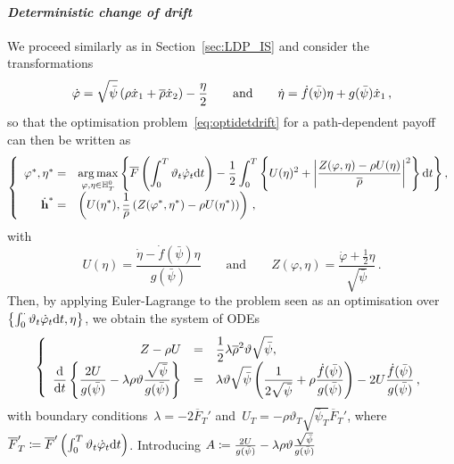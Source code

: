 \paragraph{\textit{Deterministic change of drift}}
We proceed similarly as in Section~\ref{sec:LDP_IS} and consider the  transformations
$$
\dot{\varphi} = \sqrt{\bar\psi}\left( \rho\dot{x}_1 + \overline{\rho}\dot{x}_2 \right) - \frac{\eta}{2} \qquad \text{and} \qquad \dot{\eta} = \dot{f}(\bar\psi)\eta + g(\bar\psi)\dot{x}_1\,,
$$
so that the optimisation problem~\eqref{eq:optidetdrift} for a path-dependent payoff can then be written as
\begin{equation}\label{eq:optidetdriftapplication}
\left\{
\begin{array}{rl}
\varphi^{*}, \eta^{*} = & \displaystyle  \operatorname*{arg\,max}\limits_{\varphi,\eta \in \mathbb{H}_T^0} \left\{ \overline{F}\left(\int_0^T \vartheta_t \dot{\varphi}_t \mathrm{d} t \right) 
- \frac{1}{2}\int_0^T \left\{U(\eta)^2 + \left|\frac{Z(\varphi,\eta) - \rho U(\eta)}{\overline{\rho}}\right|^2\right \}\mathrm{d} t \right\},\\
\dot{\boldsymbol{\mathrm{h}}}^{*}  = & \displaystyle 
\left(U(\eta^{*}),  \frac{1}{\overline{\rho}}\left(Z(\varphi^{*}, \eta^{*}) - \rho U(\eta^{*})\right)\right)\,,
\end{array}
\right.
\end{equation}
with
$$
U(\eta) = \frac{\dot{\eta} - \dot{f}(\bar\psi)\eta}{g(\bar\psi)}
\qquad\text{and}\qquad
Z(\varphi, \eta) = \frac{\dot{\varphi} + \frac{1}{2}\eta}{\sqrt{\bar\psi}}\,. 
$$
Then, by applying Euler-Lagrange to the problem seen as an optimisation over~$\left \{\int_0^\cdot \vartheta_t\dot{\varphi}_t\mathrm{d} t,\eta\right \}$, we obtain the system of ODEs
\begin{equation*}
\left\{
\begin{array}{rcl}
Z - \rho U &=& \displaystyle \frac{1}{2}\lambda\overline{\rho}^2\vartheta \sqrt{\bar\psi},\\
\displaystyle \frac{\mathrm{d}}{\mathrm{d} t}\left\{\frac{2U}{g(\bar\psi)} - \lambda \rho \vartheta \frac{\sqrt{\bar\psi}}{g(\bar\psi)}\right\} &=& \displaystyle \lambda \vartheta \sqrt{\bar\psi} \left(\frac{1}{2\sqrt{\bar\psi}} + \rho \frac{\dot{f}(\bar\psi)}{g(\bar\psi)} \right) -2U\frac{\dot{f}(\bar\psi)}{g(\bar\psi)}\,,
\end{array}
\right.
\end{equation*}
with boundary conditions~$\lambda = - 2\overline{F}_T'$ and~$U_T = -\rho\vartheta_T\sqrt{\bar\psi_T}\overline{F}_T'$, where~$\overline{F}_T'\coloneqq \overline{F}'\left(\int_0^T\vartheta_t\dot{\varphi}_t\mathrm{d} t\right)$. 
Introducing
$A \coloneqq \frac{2U}{g(\bar\psi)} - \lambda \rho \vartheta \frac{\sqrt{\bar\psi}}{g(\bar\psi)}$
